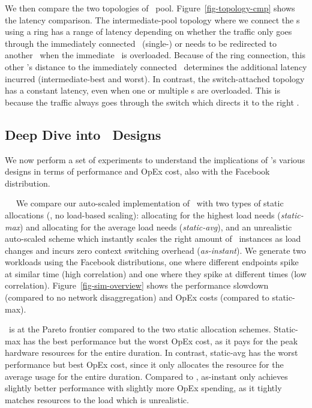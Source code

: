 We then compare the two topologies of \snic\ pool. %
Figure~\ref{fig-topology-cmp} shows the latency comparison.
The intermediate-pool topology where we connect the \snic{}s using a ring has a range of latency depending on whether the traffic only goes through the immediately connected \snic\ (single-\snic) or needs to be redirected to another \snic\ when the immediate \snic\ is overloaded. 
Because of the ring connection, this other \snic's distance to the immediately connected \snic\ determines the additional latency incurred (intermediate-best and worst).
In contrast, the switch-attached topology has a constant latency, even when one or multiple \snic{}s are overloaded. This is because the traffic always goes through the switch which directs it to the right \snic.

\subsection{Deep Dive into \snic\ Designs}
\label{sec:deepdive}

We now perform a set of experiments to understand the implications of \snic's various designs in terms of performance and OpEx cost, also with the Facebook distribution.

~~
We compare our auto-scaled implementation of \snic\ with two types of static allocations (\ie, no load-based scaling): allocating for the highest load needs ({\em static-max}) and allocating for the average load needs ({\em static-avg}), and an unrealistic auto-scaled scheme which instantly scales the right amount of \nt\ instances as load changes and incurs zero context switching overhead ({\em as-instant}).
We generate two workloads using the Facebook distributions, one where different endpoints spike at similar time (high correlation) and one where they spike at different times (low correlation).
Figure~\ref{fig-sim-overview} shows the performance slowdown (compared to no network disaggregation) and OpEx costs (compared to static-max).

\snic\ is at the Pareto frontier compared to the two static allocation schemes. Static-max has the best performance but the worst OpEx cost, as it pays for the peak hardware resources for the entire duration. In contrast, static-avg has the worst performance but best OpEx cost, since it only allocates the resource for the average usage for the entire duration.
Compared to \snic, as-instant only achieves slightly better performance with slightly more OpEx spending, as it tightly matches resources to the load which is unrealistic.

